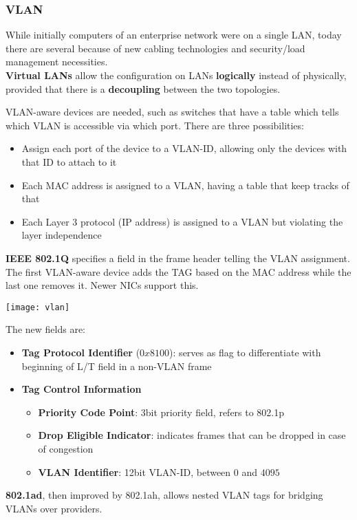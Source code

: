\subsubsection{VLAN}
While initially computers of an enterprise network were on a single LAN, today there are several because of new cabling technologies and security/load management necessities.\\
\textbf{Virtual LANs} allow the configuration on LANs \textbf{logically} instead of physically, provided that there is a \textbf{decoupling} between the two topologies.
\begin{figure}[!h]
	\hfil
	\hfil
\end{figure}
\newline VLAN-aware devices are needed, such as switches that have a table which tells which VLAN is accessible via which port. There are three possibilities:
\begin{itemize}
	\item Assign each port of the device to a VLAN-ID, allowing only the devices with that ID to attach to it
	\item Each MAC address is assigned to a VLAN, having a table that keep tracks of that
	\item Each Layer 3 protocol (IP address) is assigned to a VLAN but violating the layer independence
\end{itemize}
\textbf{IEEE 802.1Q} specifies a field in the frame header telling the VLAN assignment. The first VLAN-aware device adds the TAG based on the MAC address while the last one removes it. Newer NICs support this.
\begin{center}
	\texttt{[image: vlan]}
\end{center}
The new fields are:
\begin{itemize}
	\item \textbf{Tag Protocol Identifier} ($0x8100$): serves as flag to differentiate with beginning of L/T field in a non-VLAN frame
	\item \textbf{Tag Control Information}
	\begin{itemize}
		\item \textbf{Priority Code Point}: 3bit priority field, refers to 802.1p
		\item \textbf{Drop Eligible Indicator}: indicates frames that can be dropped in case of congestion
		\item \textbf{VLAN Identifier}: 12bit VLAN-ID, between $0$ and $4095$
	\end{itemize}
\end{itemize}
\begin{note}
	\textbf{802.1ad}, then improved by 802.1ah, allows nested VLAN tags for bridging VLANs over providers.
\end{note}

